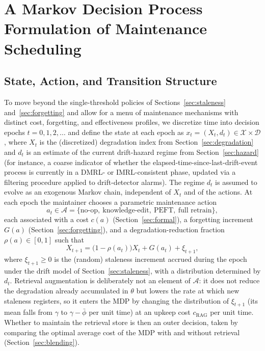 \documentclass[electronics,article,submit,pdftex,moreauthors]{Definitions/mdpi}
\newcommand{\phibar}{\bar{\phi}}
\newcommand{\cRAG}{c_{\mathrm{RAG}}}
\newcommand{\calA}{\mathcal{A}}
\newcommand{\calX}{\mathcal{X}}
\newcommand{\calD}{\mathcal{D}}
\begin{document}
\section{A Markov Decision Process Formulation of Maintenance Scheduling}\label{sec:mdp}

\subsection{State, Action, and Transition Structure}

To move beyond the single-threshold policies of Sections~\ref{sec:staleness} and~\ref{sec:forgetting} and allow for a menu of maintenance mechanisms with distinct cost, forgetting, and effectiveness profiles, we discretize time into decision epochs $t=0,1,2,\dots$ and define the state at each epoch as $x_t=(X_t,d_t)\in\calX\times\calD$, where $X_t$ is the (discretized) degradation index from Section~\ref{sec:degradation} and $d_t$ is an estimate of the current drift-hazard regime from Section~\ref{sec:hazard} (for instance, a coarse indicator of whether the elapsed-time-since-last-drift-event process is currently in a DMRL- or IMRL-consistent phase, updated via a filtering procedure applied to drift-detector alarms). The regime $d_t$ is assumed to evolve as an exogenous Markov chain, independent of $X_t$ and of the actions. At each epoch the maintainer chooses a parametric maintenance action
\begin{equation}\label{eq:actions}
a_t\in\calA=\{\text{no-op},\ \text{knowledge-edit},\ \text{PEFT},\ \text{full retrain}\},
\end{equation}
each associated with a cost $c(a)$ (Section~\ref{sec:formal}), a forgetting increment $G(a)$ (Section~\ref{sec:forgetting}), and a degradation-reduction fraction $\rho(a)\in[0,1]$ such that
\begin{equation}\label{eq:transition}
X_{t+1}=\bigl(1-\rho(a_t)\bigr)X_t+G(a_t)+\xi_{t+1},
\end{equation}
where $\xi_{t+1}\ge 0$ is the (random) staleness increment accrued during the epoch under the drift model of Section~\ref{sec:staleness}, with a distribution determined by $d_t$. Retrieval augmentation is deliberately not an element of $\calA$: it does not reduce the degradation already accumulated in $\theta$ but lowers the rate at which new staleness registers, so it enters the MDP by changing the distribution of $\xi_{t+1}$ (its mean falls from $\gamma$ to $\gamma-\phibar$ per unit time) at an upkeep cost $\cRAG$ per unit time. Whether to maintain the retrieval store is then an outer decision, taken by comparing the optimal average cost of the MDP with and without retrieval (Section~\ref{sec:blending}).
\end{document}
